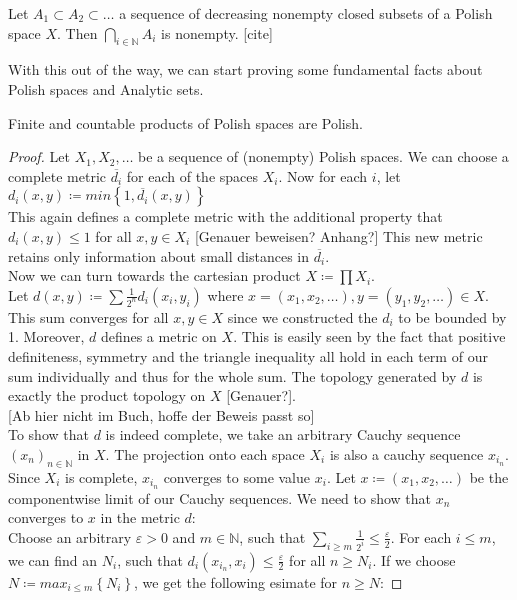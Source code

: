 \documentclass[10pt, a4paper, titlepage]{article}
\numberwithin{equation}{section}
\begin{document}
\begin{theorem}
	Let $A_1 \subset A_2 \subset \ldots$ a sequence of decreasing nonempty closed subsets of a Polish space $X$. Then  $\bigcap_{i \in  \mathbb{N}} A_i $ is nonempty. [cite]
\end{theorem}

With this out of the way, we can start proving some fundamental facts about Polish spaces and Analytic sets. 
\begin{lemma}
	\label{products}
	Finite and countable products of Polish spaces are Polish.
\end{lemma}
\begin{proof}
	Let $X_1,X_2,\ldots$ be a sequence of (nonempty) Polish spaces. We can choose a complete metric $\overline{d_i}$ for each of the spaces $X_i$. 
	Now for each $i$, let $d_i \left( x,y \right) \coloneq min \left\{ 1,\overline{d_i} \left( x,y \right)  \right\}$\\
	This again defines a complete metric with the additional property that $d_i\left( x,y \right) \leq 1$ for all $x,y \in X_i$ [Genauer beweisen? Anhang?]
This new metric retains only information about small distances in $\overline{d_i}$.\\
Now we can turn towards the cartesian product $X \coloneq \prod X_i$.\\
Let $d\left( x,y \right)\coloneq \sum \frac{1}{2^{n}} d_i\left( x_{i},y_{i} \right)$
where $x = \left( x_1,x_2,\ldots \right), y = \left( y_1,y_2,\ldots \right) \in X$. 
This sum converges for all $x,y \in X$ since we constructed the $d_i$ to be bounded by 1.
 Moreover, $d$ defines a metric on $X$. This is easily seen by the fact that positive definiteness, symmetry and the triangle inequality all hold in each term of our sum individually and thus for the whole sum. 
 The topology generated by $d$ is exactly the product topology on $X$ [Genauer?].\\

[Ab hier nicht im Buch, hoffe der Beweis passt so] \\
To show that $d$ is indeed complete, we take an arbitrary Cauchy sequence $(x_{n})_{n \in  \mathbb{N}}$ in $X$. The projection onto each  space $X_i$ is also a cauchy sequence  $x_{i_n}$.
 Since $X_i$ is complete, $x_{i_n}$ converges to some value $x_i$. 
Let $x \coloneq \left( x_1,x_2,\ldots \right) $ be the componentwise limit of our Cauchy sequences. We need to show that $x_{n}$ converges to $x$ in the metric $d$:\\
Choose an arbitrary $\varepsilon > 0 $ and $m \in  \mathbb{N}$, such that $\sum_{i \geq m} \frac{1}{2^i} \leq \frac{\varepsilon}{2} $.
For each $i \leq m$, we can find an  $N_i$, such that $d_i\left( x_{i_n},x_i \right) \leq \frac{\varepsilon}{2}$ for all $n\geq N_i$. 
If we choose $N  \coloneq max_{i \leq m}\left\{ N_i \right\} $, we get the following esimate for $n \geq N$: 


\end{proof}
\end{document}
